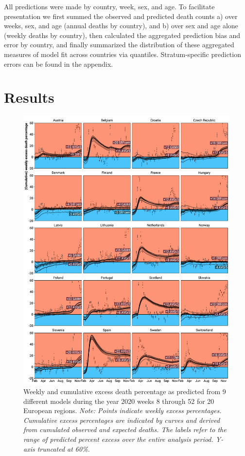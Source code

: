 \documentclass[12pt]{article}
\begin{document}
All predictions were made by country, week, sex, and age. To facilitate presentation we first summed the observed and predicted death counts a) over weeks, sex, and age (annual deaths by country), and b) over sex and age alone (weekly deaths by country), then calculated the aggregated prediction bias and error by country, and finally summarized the distribution of these aggregated measures of model fit across countries via quantiles. Stratum-specific prediction errors can be found in the appendix.

\section*{Results}


\begin{figure}
  \caption{Weekly and cumulative excess death percentage as predicted from 9 different models during the year 2020 weeks 8 through 52 for 20 European regions. \emph{Note: Points indicate weekly excess percentages. Cumulative excess percentages are indicated by curves and derived from cumulated observed and expected deaths. The labels refer to the range of predicted percent excess over the entire analysis period. Y-axis truncated at 60\%.}}
  \label{fig:excess}
  \vspace{-1em}\includegraphics{excess.pdf}
\end{figure}
\end{document}
